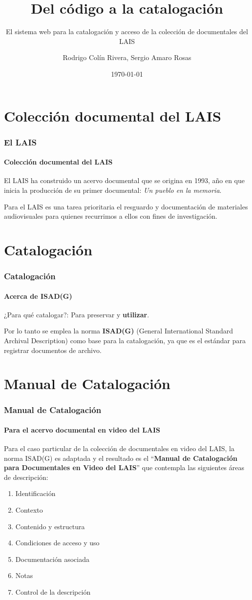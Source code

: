 \documentclass{beamer}
\title{Del código a la catalogación}
\subtitle{El sistema web para la catalogación y acceso de la colección de documentales del LAIS}
\author{Rodrigo Colín Rivera, Sergio Amaro Rosas}
\institute
{
  Laboratorio Audiovisual de Investigación Social\\
  Instituto de Investigaciones Dr. José María Luis Mora
}
\date{\today}
\begin{document}
\frame{\titlepage} %

\section{Colección documental del LAIS}
\begin{frame}
	\frametitle{El LAIS}
	\framesubtitle{Colección documental del LAIS}
	
	El LAIS ha construido un acervo documental que se origina en 1993, año en que inicia la producción de su primer documental: \textit{Un pueblo en la memoria}.

	Para el LAIS es una tarea prioritaria el resguardo y documentación de materiales audiovisuales para quienes recurrimos a ellos con fines de investigación.
	
\end{frame}

\section{Catalogación}
\begin{frame}
	\frametitle{Catalogación}
	\framesubtitle{Acerca de ISAD(G)}
	
	¿Para qué catalogar?: Para preservar y \textbf{utilizar}.
	
	Por lo tanto se emplea la norma \textbf{ISAD(G)} (General International Standard Archival Description) como base para la catalogación, ya que es el estándar para registrar documentos de archivo.
\end{frame}

\section{Manual de Catalogación}
\begin{frame}
	\frametitle{Manual de Catalogación}
	\framesubtitle{Para el acervo documental en video del LAIS}
	
	Para el caso particular de la colección de documentales en video del LAIS, la norma ISAD(G) es adaptada y el resultado es el ``\textbf{Manual de Catalogación para Documentales en Video del LAIS}'' que contempla las siguientes áreas de descripción:
	
	\begin{enumerate}
		\item Identificación
		\item Contexto
		\item Contenido y estructura
		\item Condiciones de acceso y uso
		\item Documentación asociada
		\item Notas
		\item Control de la descripción
	\end{enumerate}
\end{frame}
\end{document}
